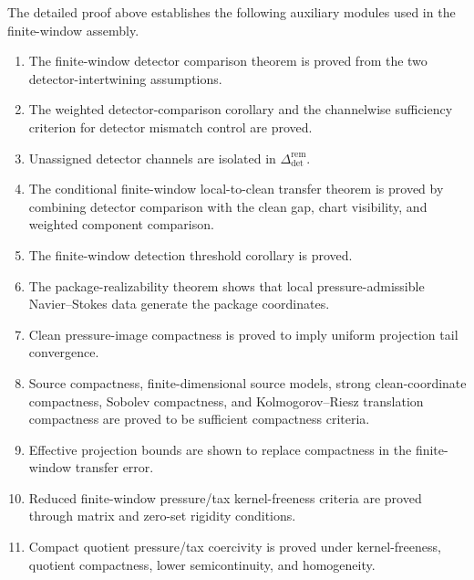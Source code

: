 \documentclass[11pt]{article}
\numberwithin{equation}{section}
\theoremstyle{definition}
\theoremstyle{remark}
\newcommand{\detc}{\mathrm{det}}
\begin{document}
The detailed proof above establishes the following auxiliary modules used in the finite-window assembly.
\begin{enumerate}[label=\textbf{Step \arabic*.},leftmargin=*]
    \item The finite-window detector comparison theorem is proved from the two
    detector-intertwining assumptions.
    \item The weighted detector-comparison corollary and the channelwise
    sufficiency criterion for detector mismatch control are proved.
    \item Unassigned detector channels are isolated in
    \(\Delta_{\detc}^{\mathrm{rem}}\).
    \item The conditional finite-window local-to-clean transfer theorem is
    proved by combining detector comparison with the clean gap, chart
    visibility, and weighted component comparison.
    \item The finite-window detection threshold corollary is proved.
    \item The package-realizability theorem shows that local
    pressure-admissible Navier--Stokes data generate the package coordinates.
    \item Clean pressure-image compactness is proved to imply uniform projection
    tail convergence.
    \item Source compactness, finite-dimensional source models, strong
    clean-coordinate compactness, Sobolev compactness, and Kolmogorov--Riesz
    translation compactness are proved to be sufficient compactness criteria.
    \item Effective projection bounds are shown to replace compactness in the
    finite-window transfer error.
    \item Reduced finite-window pressure/tax kernel-freeness criteria are proved
    through matrix and zero-set rigidity conditions.
    \item Compact quotient pressure/tax coercivity is proved under
    kernel-freeness, quotient compactness, lower semicontinuity, and
    homogeneity.
\end{enumerate}
\end{document}
